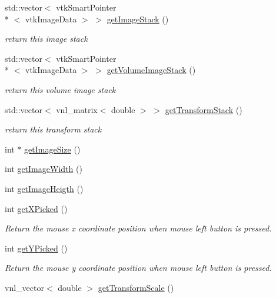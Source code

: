 \begin{DoxyCompactItemize}
std\-::vector$<$ vtk\-Smart\-Pointer\\*
$<$ vtk\-Image\-Data $>$ $>$ \hyperlink{class_q_v_t_k_image_widget_a912b460d82be67f391cb1375429ffea7}{get\-Image\-Stack} ()
\begin{DoxyCompactList}\small\item\em return this image stack \end{DoxyCompactList}\item 
std\-::vector$<$ vtk\-Smart\-Pointer\\*
$<$ vtk\-Image\-Data $>$ $>$ \hyperlink{class_q_v_t_k_image_widget_ad3ba7cb20d5ffde7777952a268139cbe}{get\-Volume\-Image\-Stack} ()
\begin{DoxyCompactList}\small\item\em return this volume image stack \end{DoxyCompactList}\item 
std\-::vector$<$ vnl\-\_\-matrix$<$ double $>$ $>$ \hyperlink{class_q_v_t_k_image_widget_a8a0bb01f7a6e19b4745296362d8e321c}{get\-Transform\-Stack} ()
\begin{DoxyCompactList}\small\item\em return this transform stack \end{DoxyCompactList}\item 
int $\ast$ \hyperlink{class_q_v_t_k_image_widget_aa2dc225bbfe290f57b0c61bde02566a8}{get\-Image\-Size} ()
\item 
int \hyperlink{class_q_v_t_k_image_widget_a73a82e34e589dc83bc98ea482ac49f53}{get\-Image\-Width} ()
\item 
int \hyperlink{class_q_v_t_k_image_widget_afbaa4d7a3881794acaef89eab7ad23ec}{get\-Image\-Heigth} ()
\item 
int \hyperlink{class_q_v_t_k_image_widget_a4d7064fe8b60c16ce6e33122595850f2}{get\-X\-Picked} ()
\begin{DoxyCompactList}\small\item\em Return the mouse x coordinate position when mouse left button is pressed. \end{DoxyCompactList}\item 
int \hyperlink{class_q_v_t_k_image_widget_a9bb1f5c8af59046c632ce4401c14999b}{get\-Y\-Picked} ()
\begin{DoxyCompactList}\small\item\em Return the mouse y coordinate position when mouse left button is pressed. \end{DoxyCompactList}\item 
vnl\-\_\-vector$<$ double $>$ \hyperlink{class_q_v_t_k_image_widget_a2ca7eefa37af83c21253b2d820d106b6}{get\-Transform\-Scale} ()

\end{DoxyCompactItemize}
